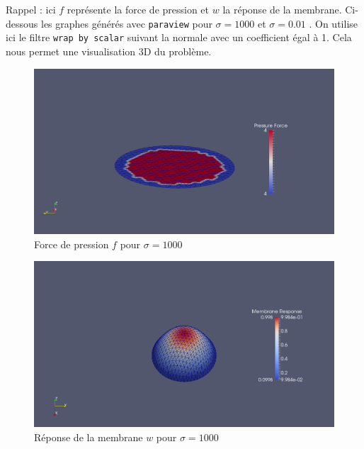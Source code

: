 \documentclass[a4paper,oneside,10pt]{report}
\begin{document}
Rappel : ici $f$ représente la force de pression et $w$ la réponse de la membrane.
Ci-dessous les graphes générés avec \texttt{paraview} pour $\sigma = 1000$ et $\sigma = 0.01$ . On utilise ici le filtre \texttt{wrap by scalar} suivant la normale avec un coefficient égal à 1. Cela nous permet une visualisation 3D du problème.

\begin{figure}[!h]
\begin{center}	
\includegraphics[width=\textwidth]{pressure_sig1000.png}
\caption{\label{fig1}Force de pression $f$ pour $\sigma = 1000$} 
\end{center}
\end{figure}

\begin{figure}[!h]
\begin{center}	
\includegraphics[width=\textwidth]{w_sig1000.png}
\caption{\label{fig1}Réponse de la membrane $w$ pour $\sigma = 1000$} 
\end{center}
\end{figure}
\end{document}
